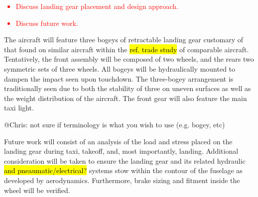 \textcolor{red}{
\begin{itemize}
    \item Discuss landing gear placement and design approach.
    \item Discuss future work.
\end{itemize}}

The aircraft will feature three bogeys of retractable landing gear customary of that found on similar aircraft within the \hl{ref. trade study} of comparable aircraft.  Tentatively, the front assembly will be composed of two wheels, and the rears two symmetric sets of three wheels.  All bogeys will be hydraulically mounted to dampen the impact seen upon touchdown.  The three-bogey arrangement is traditionally seen due to both the stability of three on uneven surfaces as well as the weight distribution of the aircraft.  The front gear will also feature the main taxi light.  

@Chris: not sure if terminology is what you wish to use (e.g. bogey, etc)

Future work will consist of an analysis of the load and stress placed on the landing gear during taxi, takeoff, and, most importantly, landing.  Additional consideration will be taken to ensure the landing gear and its related hydraulic \hl{and pneaumatic/electrical?} systems stow within the contour of the fuselage as developed by aerodynamics.  Furthermore, brake sizing and fitment inside the wheel will be verified.  